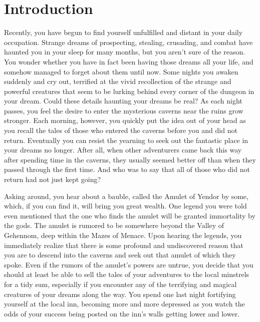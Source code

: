 \section{Introduction}


Recently, you have begun to find yourself unfulfilled and distant 
in your daily occupation.  Strange dreams of prospecting, stealing, 
crusading, and combat have haunted you in your sleep for many months, 
but you aren't sure of the reason.  You wonder whether you have in 
fact been having those dreams all your life, and somehow managed to 
forget about them until now.  Some nights you awaken suddenly
and cry out, terrified at the vivid recollection of the strange and 
powerful creatures that seem to be lurking behind every corner of the 
dungeon in your dream.  Could these details haunting your dreams be real?  
As each night passes, you feel the desire to enter the mysterious caverns 
near the ruins grow stronger.  Each morning, however, you quickly put 
the idea out of your head as you recall the tales of those who entered 
the caverns before you and did not return.  Eventually you can resist 
the yearning to seek out the fantastic place in your dreams no longer.  
After all, when other adventurers came back this way after spending time 
in the caverns, they usually seemed better off than when they passed 
through the first time.  And who was to say that all of those who did 
not return had not just kept going?


Asking around, you hear about a bauble, called the Amulet of Yendor by some,
which, if you can find it, will bring you great wealth.  One legend you were
told even mentioned that the one who finds the amulet will be granted
immortality by the gods.  The amulet is rumored to be somewhere beyond the
Valley of Gehennom, deep within the Mazes of Menace.  Upon hearing the
legends, you immediately realize that there is some profound and 
undiscovered reason that you are to descend into the caverns and seek 
out that amulet of which they spoke.  Even if the rumors of the amulet's 
powers are untrue, you decide that you should at least be able to sell the 
tales of your adventures to the local minstrels for a tidy sum, especially 
if you encounter any of the terrifying and magical creatures of 
your dreams along the way.  You spend one last night fortifying yourself 
at the local inn, becoming more and more depressed as you watch the odds 
of your success being posted on the inn's walls getting lower and lower.  


